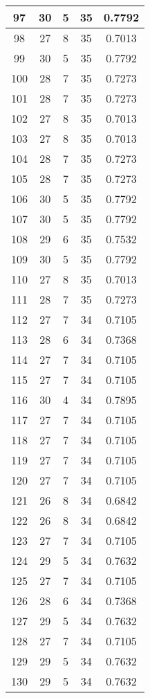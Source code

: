 \documentclass[letterpaper, 12pt]{article}
\begin{document}
\begin{longtable}{|c|c|c|c|c|}
\hline
97 & 30 & 5 & 35 & 0.7792 \\
\hline
98 & 27 & 8 & 35 & 0.7013 \\
\hline
99 & 30 & 5 & 35 & 0.7792 \\
\hline
100 & 28 & 7 & 35 & 0.7273 \\
\hline
101 & 28 & 7 & 35 & 0.7273 \\
\hline
102 & 27 & 8 & 35 & 0.7013 \\
\hline
103 & 27 & 8 & 35 & 0.7013 \\
\hline
104 & 28 & 7 & 35 & 0.7273 \\
\hline
105 & 28 & 7 & 35 & 0.7273 \\
\hline
106 & 30 & 5 & 35 & 0.7792 \\
\hline
107 & 30 & 5 & 35 & 0.7792 \\
\hline
108 & 29 & 6 & 35 & 0.7532 \\
\hline
109 & 30 & 5 & 35 & 0.7792 \\
\hline
110 & 27 & 8 & 35 & 0.7013 \\
\hline
111 & 28 & 7 & 35 & 0.7273 \\
\hline
112 & 27 & 7 & 34 & 0.7105 \\
\hline
113 & 28 & 6 & 34 & 0.7368 \\
\hline
114 & 27 & 7 & 34 & 0.7105 \\
\hline
115 & 27 & 7 & 34 & 0.7105 \\
\hline
116 & 30 & 4 & 34 & 0.7895 \\
\hline
117 & 27 & 7 & 34 & 0.7105 \\
\hline
118 & 27 & 7 & 34 & 0.7105 \\
\hline
119 & 27 & 7 & 34 & 0.7105 \\
\hline
120 & 27 & 7 & 34 & 0.7105 \\
\hline
121 & 26 & 8 & 34 & 0.6842 \\
\hline
122 & 26 & 8 & 34 & 0.6842 \\
\hline
123 & 27 & 7 & 34 & 0.7105 \\
\hline
124 & 29 & 5 & 34 & 0.7632 \\
\hline
125 & 27 & 7 & 34 & 0.7105 \\
\hline
126 & 28 & 6 & 34 & 0.7368 \\
\hline
127 & 29 & 5 & 34 & 0.7632 \\
\hline
128 & 27 & 7 & 34 & 0.7105 \\
\hline
129 & 29 & 5 & 34 & 0.7632 \\
\hline
130 & 29 & 5 & 34 & 0.7632 \\

\end{longtable}
\end{document}
